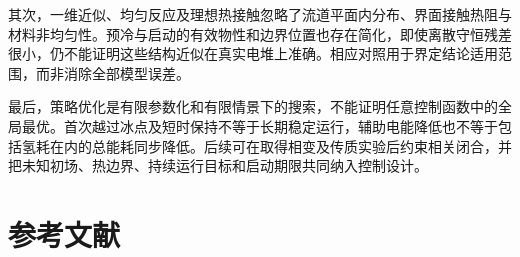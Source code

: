 \documentclass[bwprint]{gmcmthesis}
\numberwithin{equation}{section}
\numberwithin{figure}{section}
\begin{document}
其次，一维近似、均匀反应及理想热接触忽略了流道平面内分布、界面接触热阻与材料非均匀性。预冷与启动的有效物性和边界位置也存在简化，即使离散守恒残差很小，仍不能证明这些结构近似在真实电堆上准确。相应对照用于界定结论适用范围，而非消除全部模型误差。

\begin{samepage}
最后，策略优化是有限参数化和有限情景下的搜索，不能证明任意控制函数中的全局最优。首次越过冰点及短时保持不等于长期稳定运行，辅助电能降低也不等于包括氢耗在内的总能耗同步降低。后续可在取得相变及传质实验后约束相关闭合，并把未知初场、热边界、持续运行目标和启动期限共同纳入控制设计。\par
\end{samepage}

\section{参考文献}
\end{document}
